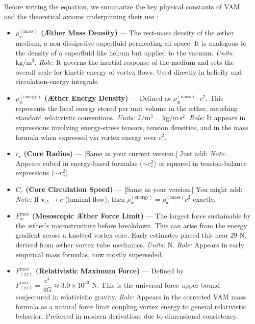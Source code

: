     Before writing the equation, we summarize the key physical constants of VAM and the theoretical axioms underpinning their use \cite{Iskandarani2025a,Iskandarani2025b}:

\begin{itemize}
    \item \textbf{$\rho_{\text{\ae}}^{(\mathrm{mass})}$ (Æther Mass Density)} — The rest-mass density of the æther medium, a non-dissipative superfluid permeating all space. It is analogous to the density of a superfluid like helium but applied to the vacuum. \textit{Units:} $\mathrm{kg/m^3}$. \textit{Role:} It governs the inertial response of the medium and sets the overall scale for kinetic energy of vortex flows. Used directly in helicity and circulation-energy integrals.

    \item \textbf{$\rho_{\text{\ae}}^{(\mathrm{energy})}$ (Æther Energy Density)} — Defined as $\rho_{\text{\ae}}^{(\mathrm{mass})} \cdot c^2$. This represents the local energy stored per unit volume in the æther, matching standard relativistic conventions. \textit{Units:} $\mathrm{J/m^3} = \mathrm{kg/m\,s^2}$. \textit{Role:} It appears in expressions involving energy-stress tensors, tension densities, and in the mass formula when expressed via vortex energy over $c^2$.

    \item \textbf{$r_c$ (Core Radius)} — [Same as your current version.] Just add: \textit{Note:} Appears cubed in energy-based formulas ($\sim r_c^3$) or squared in tension-balance expressions ($\sim r_c^2$).

    \item \textbf{$C_e$ (Core Circulation Speed)} — [Same as your version.] You might add: \textit{Note:} If $\mathbf{v}_{\scriptscriptstyle\boldsymbol{\circlearrowleft}} \to c$ (luminal flow), then $\rho_{\text{\ae}}^{(\mathrm{energy})} = \rho_{\text{\ae}}^{(\mathrm{mass})} c^2$ exactly.

    \item \textbf{$F^{\max}_{\text{\ae}}$ (Mesoscopic Æther Force Limit)} — The largest force sustainable by the æther's microstructure before breakdown. This can arise from the energy gradient across a knotted vortex core. Early estimates placed this near $29$ N, derived from æther vortex tube mechanics. \textit{Units:} N. \textit{Role:} Appears in early empirical mass formulas, now mostly superseded.

    \item \textbf{$F^{\max}_{(\mathrm{gr})}$ (Relativistic Maximum Force)} — Defined by $F^{\max}_{(\mathrm{gr})} = \dfrac{c^4}{4G} \approx 3.0 \times 10^{43}$ N. This is the universal force upper bound conjectured in relativistic gravity. \textit{Role:} Appears in the corrected VAM mass formula as a natural force limit coupling vortex energy to general relativistic behavior. Preferred in modern derivations due to dimensional consistency.
\end{itemize}


